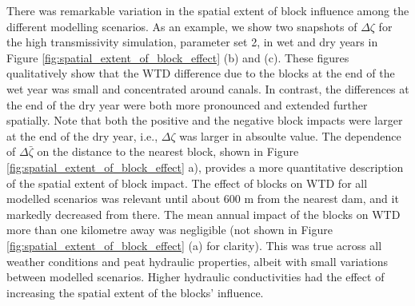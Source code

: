 \documentclass[bg, manuscript]{copernicus}
\begin{document}

There was remarkable variation in the spatial extent of  block influence among the different modelling scenarios.
As an example, we show two snapshots of $\Delta \zeta$ for the high transmissivity simulation, parameter set 2, in wet and dry years in Figure \ref{fig:spatial_extent_of_block_effect} (b) and (c).
These figures qualitatively show that the WTD difference due to the blocks at the end of the wet year was small and concentrated around canals.
In contrast, the differences at the end of the dry year were both more pronounced and extended further spatially.
Note that both the positive and the negative block impacts were larger at the end of the dry year, i.e., $\Delta \zeta$ was larger in absoulte value.
The dependence of $\Delta \bar{\zeta}$ on the distance to the nearest block, shown in Figure \ref{fig:spatial_extent_of_block_effect} a), provides a more quantitative description of the spatial extent of block impact.
The effect of blocks on WTD for all modelled scenarios was relevant until about $600$ \unit{m} from the nearest dam, and it markedly decreased from there.
The mean annual impact of the blocks on WTD more than one kilometre away was negligible (not shown in Figure \ref{fig:spatial_extent_of_block_effect} (a) for clarity).
This was true across all weather conditions and peat hydraulic properties, albeit with small variations between modelled scenarios.
Higher hydraulic conductivities had the effect of increasing the spatial extent of the blocks' influence.
\end{document}
